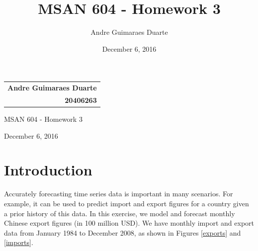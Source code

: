 \documentclass[]{article}
\title{MSAN 604 - Homework 3}
\author{Andre Guimaraes Duarte}
\date{December 6, 2016}
\begin{document}
\null\hfill\begin{tabular}[t]{r@{}}
  \textbf{\LARGE Andre Guimaraes Duarte} \\
  \textbf{\Large 20406263}
\end{tabular}

\begin{center}
\Huge
MSAN 604 - Homework 3

\Large
December 6, 2016

\normalsize
\end{center}

\section{Introduction}
Accurately forecasting time series data is important in many scenarios. For example, it can be used to predict import and export figures for a country given a prior history of this data. In this exercise, we model and forecast monthly Chinese export figures
(in 100 million USD). We have monthly import and export data from January 1984 to December 2008, as shown in Figures \ref{exports} and \ref{imports}.
\end{document}
